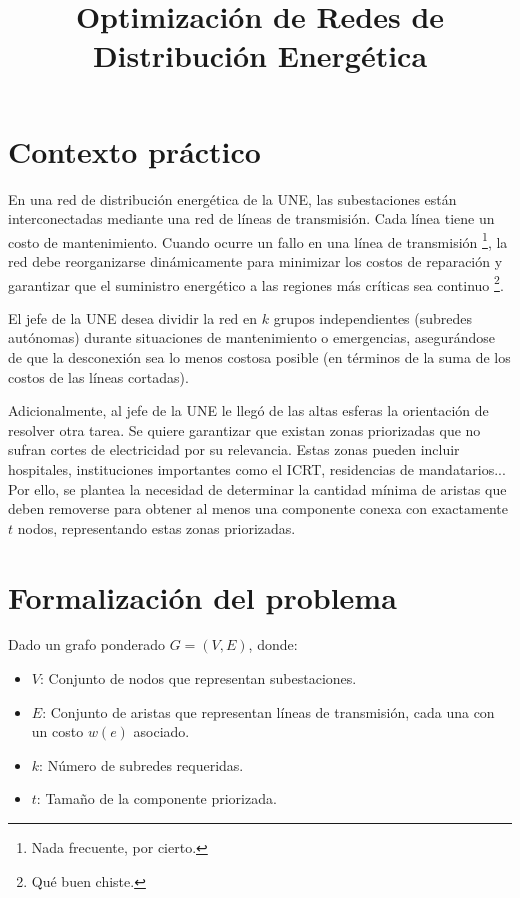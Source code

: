 \documentclass[a4paper, 12pt]{article}
\title{\textbf{Optimización de Redes de Distribución Energética}}
\author{}
\date{}
\begin{document}
\maketitle

\section*{Contexto práctico}
En una red de distribución energética de la UNE, 
las subestaciones están interconectadas mediante 
una red de líneas de transmisión. Cada línea tiene 
un costo de mantenimiento. 
Cuando ocurre un fallo en una línea de transmisión 
\footnote{Nada frecuente, por cierto.}, 
la red debe reorganizarse dinámicamente 
para minimizar los costos de reparación y garantizar 
que el suministro energético a las regiones más 
críticas sea continuo \footnote{Qué buen chiste.}.

El jefe de la UNE desea dividir la red en \( k \) 
grupos independientes (subredes autónomas) durante 
situaciones de mantenimiento o emergencias, 
asegurándose de que la desconexión sea lo menos 
costosa posible (en términos de la suma de los 
costos de las líneas cortadas).

Adicionalmente, al jefe de la UNE le llegó de las altas esferas
la orientación de resolver otra tarea. 
Se quiere garantizar que existan zonas priorizadas que 
no sufran cortes de electricidad por su relevancia. 
Estas zonas pueden incluir hospitales, instituciones importantes como el ICRT, 
residencias de mandatarios... 
Por ello, se plantea la necesidad de determinar la 
cantidad mínima de aristas que deben removerse para 
obtener al menos una componente conexa con 
exactamente \( t \) nodos, representando estas zonas 
priorizadas.

\section*{Formalización del problema}
Dado un grafo ponderado \( G = (V, E) \), donde:
\begin{itemize}
    \item \( V \): Conjunto de nodos que representan subestaciones.
    \item \( E \): Conjunto de aristas que representan líneas de transmisión, cada una con un costo \( w(e) \) asociado.
    \item \( k \): Número de subredes requeridas.
    \item \( t \): Tamaño de la componente priorizada.
\end{itemize}
\end{document}
